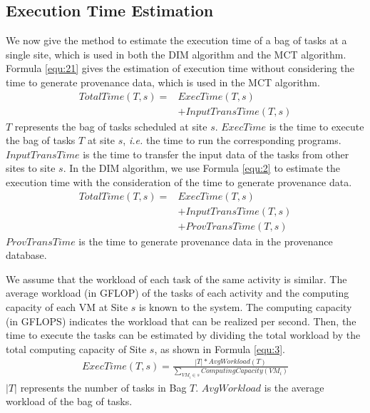 \subsection{Execution Time Estimation}
\label{subsec:ETE}
We now give the method to estimate the execution time of a bag of tasks at a single site, which is used in both the DIM algorithm and the MCT algorithm.
Formula \ref{equ:21} gives the estimation of execution time without considering the time to generate provenance data, which is used in the MCT algorithm.
\begin{equation}\label{equ:21}
\begin{split}
TotalTime( T, s ) = & ExecTime( T, s ) \\
&+ InputTransTime( T, s ) 
\end{split}
\end{equation}
$T$ represents the bag of tasks scheduled at site $s$. $ExecTime$ is the time to execute the bag of tasks $T$ at site $s$, \textit{i.e.} the time to run the corresponding programs. $InputTransTime$ is the time to transfer the input data of the tasks from other sites to site $s$. 
In the DIM algorithm, we use Formula \ref{equ:2} to estimate the execution time with the consideration of the time to generate provenance data.
\begin{equation}\label{equ:2}
\begin{split}
TotalTime( T, s ) = & ExecTime( T, s ) \\
&+ InputTransTime( T, s ) \\
&+ ProvTransTime( T, s )
\end{split}
\end{equation}
$ProvTransTime$ is the time to generate provenance data in the provenance database. 

We assume that the workload of each task of the same activity is similar. The average workload (in GFLOP) of the tasks of each activity and the computing capacity of each VM at Site $s$ is known to the system. The computing capacity (in GFLOPS) indicates the workload that can be realized per second. Then, the time to execute the tasks can be estimated by dividing the total workload by the total computing capacity of Site $s$, as shown in Formula \ref{equ:3}.
\begin{equation}\label{equ:3}
\begin{split}
ExecTime( T, s ) = \frac{|T| * AvgWorkload( T )}{\sum_{VM_i \in s}ComputingCapacity( VM_i )} 
\end{split}
\end{equation}
$|T|$ represents the number of tasks in Bag $T$. $AvgWorkload$ is the average workload of the bag of tasks. 

